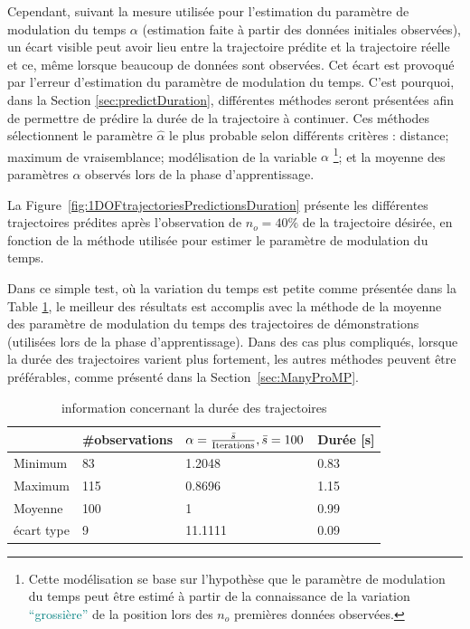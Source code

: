 \documentclass[utf8]{frontiersSCNS} %
\newcommand{\toimprove}[1]{\textcolor{teal}{#1}}
\newcommand{\todo}[1]{\textcolor{red}{\textbf{/*#1*/}}}
\begin{document}
Cependant, suivant la mesure  utilisée pour l'estimation du paramètre de modulation du temps $\alpha$ (estimation faite à partir des données initiales observées), un écart visible peut avoir lieu entre la trajectoire prédite et la trajectoire réelle  et ce, même lorsque beaucoup de données sont observées. Cet écart est  provoqué par l'erreur d'estimation du paramètre de modulation du temps. C'est pourquoi, dans la Section \ref{sec:predictDuration}, différentes méthodes seront présentées afin de permettre de prédire la durée de la trajectoire à continuer. Ces méthodes sélectionnent le paramètre $\hat{\alpha}$ le plus probable selon différents critères : distance; maximum de vraisemblance; modélisation de la variable $\alpha$ \footnote{Cette modélisation se base sur l'hypothèse que le paramètre de modulation du temps peut être estimé à partir de la connaissance de la variation \toimprove{``grossière''} de la position lors des $n_o$ premières données observées.}; et la moyenne des paramètres $\alpha$ observés lors de la phase d'apprentissage.
%
%

La Figure~\ref{fig:1DOFtrajectoriesPredictionsDuration} présente les différentes trajectoires prédites après l'observation de $n_{o}=40\%$ de la trajectoire désirée, en fonction de la méthode utilisée pour estimer le paramètre de modulation du temps. 

Dans ce simple test, où la variation du temps est petite comme présentée dans la Table \ref{tab:alphaProMP}, le meilleur des résultats est accomplis avec la méthode de la moyenne des paramètre de modulation du temps des trajectoires de démonstrations (utilisées lors de la phase d'apprentissage). Dans des cas plus compliqués, lorsque la durée des trajectoires varient plus fortement, les autres méthodes peuvent être préférables, comme présenté dans la Section~\ref{sec:ManyProMP}.
\begin{table}
\center
\begin{tabular}{|p{2.5cm}|p{2.5cm}|p{4.5cm}|p{2.5cm}|}
  \hline
    & \#observations & $\alpha = {\bar{s} \over \mathrm{Iterations}}, \bar{s}=100$ & Durée [s] \\
     \hline
     Minimum & 83 & 1.2048 & 0.83 \\
     \hline
     Maximum & 115 & 0.8696 & 1.15\\
     \hline
     Moyenne & 100& 1& 0.99 \\
     \hline
     écart type & 9 & 11.1111 & 0.09 \\
     \hline
\end{tabular}
\caption{information concernant la durée des trajectoires}
\label{tab:alphaProMP}
\end{table} 
\end{document}
